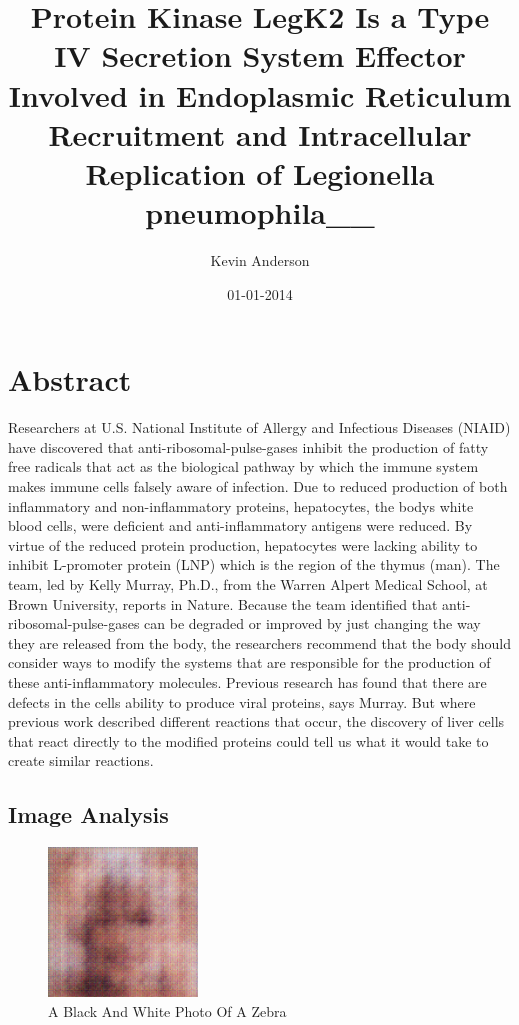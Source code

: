 \documentclass{article}%
\title{Protein Kinase LegK2 Is a Type IV Secretion System Effector Involved in Endoplasmic Reticulum Recruitment and Intracellular Replication of Legionella pneumophila\_\_}%
\author{Kevin Anderson}%
\affil{Department of Biology, Pamukkale University, Kinikli Campus, 20070 Denizli, Turkey}%
\date{01{-}01{-}2014}%
\begin{document}
%
\normalsize%
\maketitle%
\section{Abstract}%
\label{sec:Abstract}%
Researchers at U.S. National Institute of Allergy and Infectious Diseases (NIAID) have discovered that anti{-}ribosomal{-}pulse{-}gases inhibit the production of fatty free radicals that act as the biological pathway by which the immune system makes immune cells falsely aware of infection. Due to reduced production of both inflammatory and non{-}inflammatory proteins, hepatocytes, the bodys white blood cells, were deficient and anti{-}inflammatory antigens were reduced. By virtue of the reduced protein production, hepatocytes were lacking ability to inhibit L{-}promoter protein (LNP) which is the region of the thymus (man). The team, led by Kelly Murray, Ph.D., from the Warren Alpert Medical School, at Brown University, reports in Nature.\newline%
Because the team identified that anti{-}ribosomal{-}pulse{-}gases can be degraded or improved by just changing the way they are released from the body, the researchers recommend that the body should consider ways to modify the systems that are responsible for the production of these anti{-}inflammatory molecules.\newline%
Previous research has found that there are defects in the cells ability to produce viral proteins, says Murray. But where previous work described different reactions that occur, the discovery of liver cells that react directly to the modified proteins could tell us what it would take to create similar reactions.

%
\subsection{Image Analysis}%
\label{subsec:ImageAnalysis}%


\begin{figure}[h!]%
\centering%
\includegraphics[width=150px]{500_fake_images/samples_5_425.png}%
\caption{A Black And White Photo Of A Zebra}%
\end{figure}

%
\end{document}
